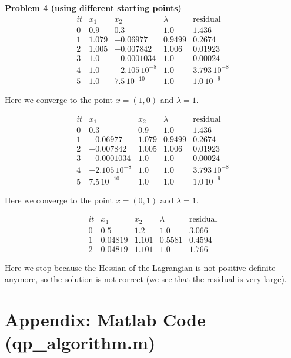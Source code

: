 \documentclass{article}
\begin{document}
\textbf{Problem 4 (using different starting points)}
\[
\begin{array}{ccccc} 
it &  x_1 & x_2 & \lambda & \text{residual}\\
\hline
0 & 0.9 & 0.3 & 1.0 & 1.436\\ 1 & 1.079 & -0.06977 & 0.9499 & 0.2674\\ 2 & 1.005 & -0.007842 & 1.006 & 0.01923\\ 3 & 1.0 & -0.0001034 & 1.0 & 0.00024\\ 4 & 1.0 & -2.105\,{10}^{-8} & 1.0 & 3.793\,{10}^{-8}\\ 5 & 1.0 & 7.5\,{10}^{-10} & 1.0 & 1.0\,{10}^{-9} \end{array}
\]

Here we converge to the point $x=(1,0)$ and $\lambda=1$.

\bigskip

\[
\begin{array}{ccccc}
it &  x_1 & x_2 & \lambda & \text{residual}\\
\hline
0 & 0.3 & 0.9 & 1.0 & 1.436\\ 1 & -0.06977 & 1.079 & 0.9499 & 0.2674\\ 2 & -0.007842 & 1.005 & 1.006 & 0.01923\\ 3 & -0.0001034 & 1.0 & 1.0 & 0.00024\\ 4 & -2.105\,{10}^{-8} & 1.0 & 1.0 & 3.793\,{10}^{-8}\\ 5 & 7.5\,{10}^{-10} & 1.0 & 1.0 & 1.0\,{10}^{-9} \end{array}
\]

Here we converge to the point $x=(0,1)$ and $\lambda=1$.

\[
\begin{array}{ccccc}
it &  x_1 & x_2 & \lambda & \text{residual}\\
\hline
0 & 0.5 & 1.2 & 1.0 & 3.066\\ 1 & 0.04819 & 1.101 & 0.5581 & 0.4594\\ 2 & 0.04819 & 1.101 & 1.0 & 1.766 \end{array}
\]

Here we stop because the Hessian of the Lagrangian is not positive definite anymore, so the solution is not correct (we see that the residual is very large).

\newpage

\section*{Appendix: Matlab Code (qp\_algorithm.m)}


\end{document}
